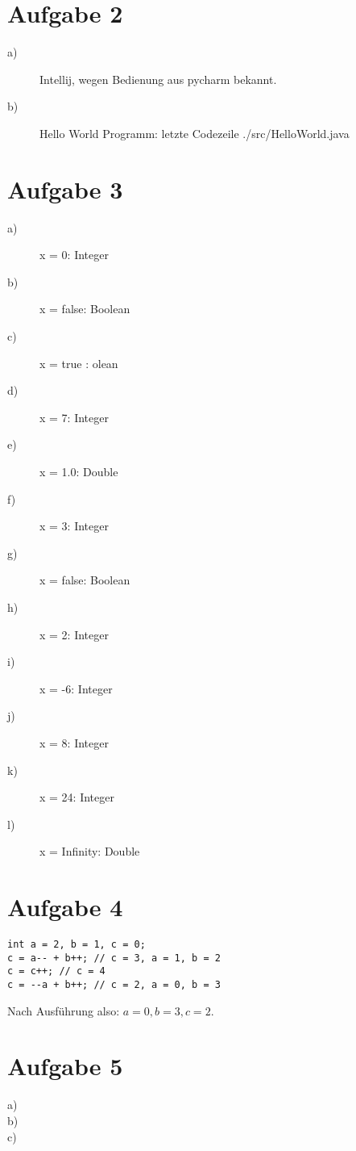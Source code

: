 \section{Aufgabe 2}
\begin{description}
\item[a)]
Intellij, wegen Bedienung aus pycharm bekannt. 
\item[b)]
Hello World Programm:
 letzte Codezeile
{./src/HelloWorld.java}

\end{description}

\section{Aufgabe 3}
\begin{description}
\item[a)] x = 0: 	 Integer
\item[b)] x = false: 	 Boolean
\item[c)] x = true 	: 	olean
\item[d)] x = 7: 	 Integer
\item[e)] x = 1.0: 	 Double
\item[f)] x = 3: 	 Integer
\item[g)] x = false: 	 Boolean
\item[h)] x = 2: 	 Integer
\item[i)] x = -6: 	 Integer
\item[j)] x = 8: 	 Integer
\item[k)] x = 24: 	 Integer
\item[l)] x = Infinity: 	 Double
\end{description}

\section{Aufgabe 4}
\begin{lstlisting}
int a = 2, b = 1, c = 0;
c = a-- + b++; // c = 3, a = 1, b = 2
c = c++; // c = 4
c = --a + b++; // c = 2, a = 0, b = 3
\end{lstlisting}
Nach Ausführung also: $a = 0, b = 3, c = 2$.

\section{Aufgabe 5}
\begin{description}
\item[a)] 
\item[b)] 
\item[c)]
\end{description}




